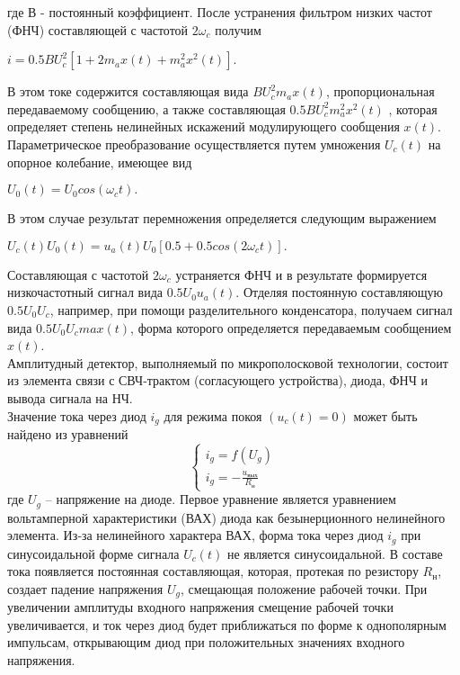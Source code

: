 \documentclass{bmstu}
\begin{document}
	где $В$ - постоянный коэффициент. После устранения фильтром низких частот
	(ФНЧ) составляющей с частотой $2\omega_c$ получим
	\begin{center}
		$i = 0.5 B U_c^2[1 + 2m_a x(t) + m_a^2 x^2(t)].$
	\end{center}
\indent	В этом токе содержится составляющая вида $BU_c^2m_ax(t)$, пропорциональная
	передаваемому сообщению, а также составляющая $0.5BU_c^2m_a^2x^2(t)$
	, которая определяет степень нелинейных искажений модулирующего сообщения
	$x(t)$. \\
	Параметрическое преобразование осуществляется путем умножения $U_c(t)$ на
	опорное колебание, имеющее вид 
	\begin{center}
		$U_0(t) = U_0 cos(\omega_c t).$
	\end{center}
	В этом случае результат перемножения определяется следующим выражением
	\begin{center}
		$U_c(t)U_0(t) = u_a(t)U_0[0.5 + 0.5cos(2\omega_c t)].$
	\end{center}
\indent	Составляющая с частотой $2\omega_c$ устраняется ФНЧ и в результате 
	формируется низкочастотный сигнал вида $0.5 U_0 u_a(t)$. Отделяя постоянную 
	составляющую $0.5 U_0 U_c$, например, при помощи разделительного конденсатора, 
	получаем сигнал вида $0.5 U_0 U_c max(t)$, форма которого определяется 
	передаваемым сообщением $x(t)$. \\
\indent	Амплитудный детектор, выполняемый по микрополосковой технологии, состоит из
	элемента связи с СВЧ‐трактом (согласующего устройства), диода, ФНЧ и вывода
	сигнала на НЧ. \\
\indent	Значение тока через диод $i_g$ для режима покоя $(u_c(t)=0)$ может быть 
	найдено из уравнений
	\begin{equation*}
		\begin{cases}
			 i_g = f(U_g)\\
			 i_g = - \frac{u_\text{вых}}{R_\text{н}}
		\end{cases}
	\end{equation*}
\indent	где $U_g$ – напряжение на диоде. Первое уравнение является уравнением 		
	вольтамперной характеристики (ВАХ) диода как безынерционного нелинейного 
	элемента. Из‐за нелинейного характера ВАХ, форма тока через диод $i_g$ при 
	синусоидальной форме сигнала $U_c(t)$ не является синусоидальной. В составе 
	тока появляется постоянная составляющая, которая, протекая по резистору 
	$R_\text{н}$, создает падение напряжения $U_g$, смещающая положение рабочей 
	точки. При увеличении амплитуды входного напряжения смещение рабочей точки 
	увеличивается, и ток через диод будет приближаться по форме к однополярным 
	импульсам, открывающим диод при положительных значениях входного напряжения.
	 
\end{document}
